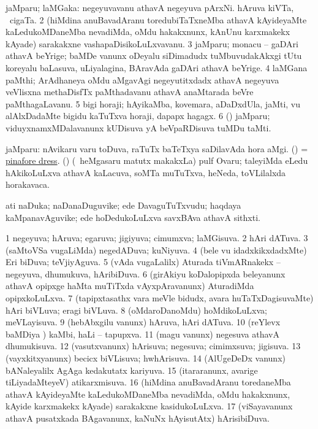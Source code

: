 \bentry
{}
\gl{\nA}
\bmng
\bnum
{} jaMparu; laMGaka: 
\banum
{} negeyuvavanu athavA negeyuva pArxNi. 
 hAruva kiVTa, \udA\ cigaTa. 
\eanum
\numie
\num{2} (hiMdina anuBavadAranu toredubiTaTxneMba athavA kAyideyaMte kaLedukoMDaneMba nevadiMda, oMdu hakakxnunx, kAnUnu karxmakekx kAyade) sarakakxne vashapaDisikoLuLxvavanu. 
\num{3} jaMparu; monacu -- gaDAri athavA beYrige; baMDe \mo vanunx oDeyalu siDimadudx tuMbuvudakAkxgi tUtu koreyalu baLasuva, uLiyalagina, BAravAda gaDAri athavA beYrige. 
\num{4} laMGana paMthi; ArAdhaneya oMdu aMgavAgi negeyutitxdadx athavA negeyuva veVlisxna methaDisfTx paMthadavanu athavA anaMtarada beVre paMthagaLavanu. 
\num{5} bigi horaji; hAyikaMba, kovemara, aDaDxdUla, jaMti, \mo vu alAlxDadaMte bigidu kaTuTxva horaji, dapapx hagagx. 
\num{6} (\viduyx) jaMparu; viduyxnamxMDalavanunx kUDisuva yA beVpaRDisuva tuMDu taMti. 
\enum
\emng
\eentry



\bentry
{}
\gl{\nA}
\bmng
jaMparu: 
\banum
{} nAvikaru \mo varu toDuva, raTuTx baTeTxya saDilavAda hora aMgi. 
 (\ame) = \hyperref{kandict_p.pdf}{P}{pinafore dress}{pinafore dress}. 
 (\birx) (\sA\ heMgasaru matutx makakxLa) pulf Ovaru; taleyiMda eLedu hAkikoLuLxva athavA kaLacuva, soMTa muTuTxva, heNeda, toVLilalxda horakavaca. 
\eanum
\emng
\eentry

\bentry
{}
\gl{\nA}
\bmng
ati naDuka; naDanaDuguvike; ede DavaguTuTxvudu; haqdaya kaMpanavAguvike; ede hoDedukoLuLxva savxBAva athavA sithxti. 
\emng
\eentry

\bentry
{}
\gl{\gu}
\bmng
\bnum
\num{1} negeyuva; hAruva; egaruva; jigiyuva; cimumxva; laMGisuva. 
\num{2} hAri dATuva. 
\num{3} (saMtoVSa \mo vugaLiMda) negedADuva; kuNiyuva. 
\num{4} (bele \mo vu idadxkikxdadxMte) Eri biDuva; teVjiyAguva. 
\num{5} (vAda \mo vugaLalilx) Aturada tiVmARnakekx -- negeyuva, dhumukuva, hAribiDuva. 
\num{6} (girAkiyu koDalopipxda beleyanunx athavA opipxge haMta muTiTxda vAyxpAravanunx) AturadiMda opipxkoLuLxva. 
\num{7} (tapipxtasathx \mo vara meVle bidudx, avara huTaTxDagisuvaMte) hAri biVLuva; eragi biVLuva. 
\num{8} (oMdaroDanoMdu) hoMdikoLuLxva; meVLayisuva. 
\num{9} (hebAbxgilu \mo vanunx) hAruva, hAri dATuva. 
\num{10} (reYlevx baMDiya \vi) kaMbi, haLi -- tapupxva. 
\num{11} (magu \mo vanunx) negesuva athavA dhumukisuva. 
\num{12} (vasutxvanunx) hArisuva; negesuva; cimimxsuva; jigisuva. 
\num{13} (vayxkitxyanunx) becicx biVLisuva; hwhArisuva. 
\num{14} (AlUgeDeDx \mo vanunx) bANaleyalilx AgAga kedakutatx kariyuva. 
\num{15} (itararanunx, avarige tiLiyadaMteyeV) atikarxmisuva. 
\num{16} (hiMdina anuBavadAranu toredaneMba athavA kAyideyaMte kaLedukoMDaneMba nevadiMda, oMdu hakakxnunx, kAyide karxmakekx kAyade) sarakakxne kasidukoLuLxva. 
\num{17} (viSayavanunx athavA pusatxkada BAgavanunx, kaNuNx hAyisutAtx) hArisibiDuva. 
\enum
\emng
\eentry

